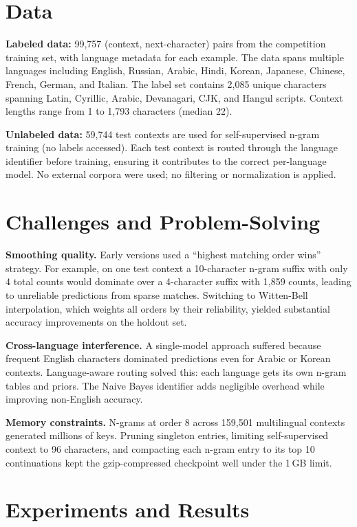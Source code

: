 \documentclass[11pt]{article}
\begin{document}
\section{Data}

\textbf{Labeled data:} 99,757 (context, next-character) pairs from the competition training set, with language metadata for each example. The data spans multiple languages including English, Russian, Arabic, Hindi, Korean, Japanese, Chinese, French, German, and Italian. The label set contains 2,085 unique characters spanning Latin, Cyrillic, Arabic, Devanagari, CJK, and Hangul scripts. Context lengths range from 1 to 1,793 characters (median 22).

\textbf{Unlabeled data:} 59,744 test contexts are used for self-supervised n-gram training (no labels accessed). Each test context is routed through the language identifier before training, ensuring it contributes to the correct per-language model. No external corpora were used; no filtering or normalization is applied.

\section{Challenges and Problem-Solving}

\textbf{Smoothing quality.}
Early versions used a ``highest matching order wins'' strategy. For example, on one test context a 10-character n-gram suffix with only 4 total counts would dominate over a 4-character suffix with 1,859 counts, leading to unreliable predictions from sparse matches. Switching to Witten-Bell interpolation, which weights all orders by their reliability, yielded substantial accuracy improvements on the holdout set.

\textbf{Cross-language interference.}
A single-model approach suffered because frequent English characters dominated predictions even for Arabic or Korean contexts. Language-aware routing solved this: each language gets its own n-gram tables and priors. The Naive Bayes identifier adds negligible overhead while improving non-English accuracy.

\textbf{Memory constraints.}
N-grams at order 8 across 159,501 multilingual contexts generated millions of keys. Pruning singleton entries, limiting self-supervised context to 96 characters, and compacting each n-gram entry to its top 10 continuations kept the gzip-compressed checkpoint well under the 1\,GB limit.

\section{Experiments and Results}
\end{document}
